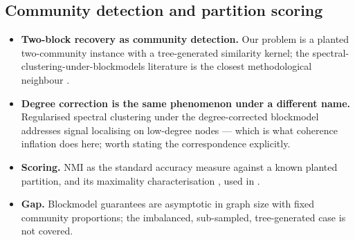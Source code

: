 \subsection*{Community detection and partition scoring}
\begin{itemize}[leftmargin=1.4em, itemsep=3pt, topsep=2pt]
  \item \textbf{Two-block recovery as community detection.} Our problem is a
        planted two-community instance with a tree-generated similarity kernel;
        the spectral-clustering-under-blockmodels literature is the closest
        methodological neighbour \cite{fortunato2010community, qinrohe2013regularized}.
  \item \textbf{Degree correction is the same phenomenon under a different
        name.} Regularised spectral clustering under the degree-corrected
        blockmodel \cite{qinrohe2013regularized} addresses signal localising on
        low-degree nodes --- which is what coherence inflation does here; worth
        stating the correspondence explicitly.
  \item \textbf{Scoring.} NMI as the standard accuracy measure against a known
        planted partition, and its maximality characterisation
        \cite{strehlghosh2002cluster, fortunato2010community}, used in
        .
  \item \textbf{Gap.} Blockmodel guarantees are asymptotic in graph size with
        fixed community proportions; the imbalanced, sub-sampled, tree-generated
        case is not covered.
\end{itemize}

